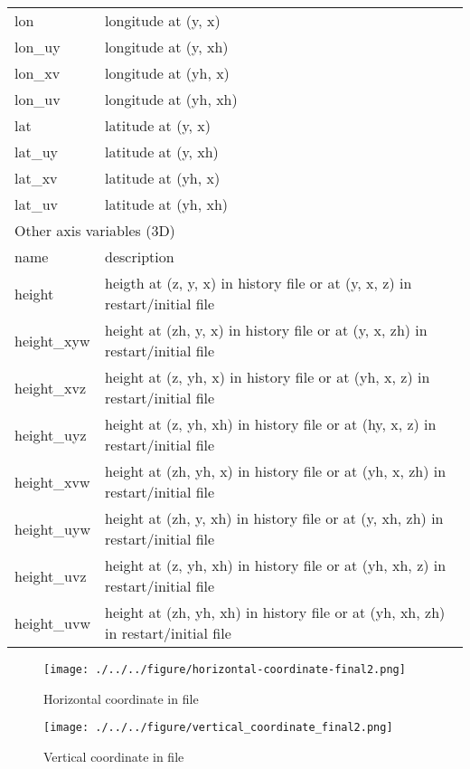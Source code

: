 \begin{longtable}{l|l}
lon     & longitude at (y, x) \\
lon\_uy & longitude at (y, xh) \\
lon\_xv & longitude at (yh, x) \\
lon\_uv & longitude at (yh, xh) \\
lat     & latitude  at (y, x) \\
lat\_uy & latitude  at (y, xh) \\
lat\_xv & latitude  at (yh, x) \\
lat\_uv & latitude  at (yh, xh) \\
\hline
\multicolumn{2}{l}{Other axis variables (3D)}\\ \hline
name & description \\ \hline \hline
height      & heigth at (z, y, x)    in history file or at (y, x, z)    in restart/initial file\\
height\_xyw & height at (zh, y, x)   in history file or at (y, x, zh)   in restart/initial file\\
height\_xvz & height at (z, yh, x)   in history file or at (yh, x, z)   in restart/initial file\\
height\_uyz & height at (z, yh, xh)  in history file or at (hy, x, z)   in restart/initial file\\
height\_xvw & height at (zh, yh, x)  in history file or at (yh, x, zh)  in restart/initial file\\
height\_uyw & height at (zh, y, xh)  in history file or at (y, xh, zh)  in restart/initial file\\
height\_uvz & height at (z, yh, xh)  in history file or at (yh, xh, z)  in restart/initial file\\
height\_uvw & height at (zh, yh, xh) in history file or at (yh, xh, zh) in restart/initial file\\
\end{longtable}



\begin{figure}[tbh]
\begin{center}
  \texttt{[image: ./../../figure/horizontal-coordinate-final2.png]}\\
  \caption{Horizontal coordinate in {\scalenetcdf} file}
  \label{fig:netcdfhorizontalcoordinate}
\end{center}
\end{figure}
\begin{figure}[tbh]
\begin{center}
  \texttt{[image: ./../../figure/vertical\_coordinate\_final2.png]}\\
  \caption{Vertical coordinate in {\scalenetcdf} file}
  \label{fig:netcdfverticalcoordinate}
\end{center}
\end{figure}




